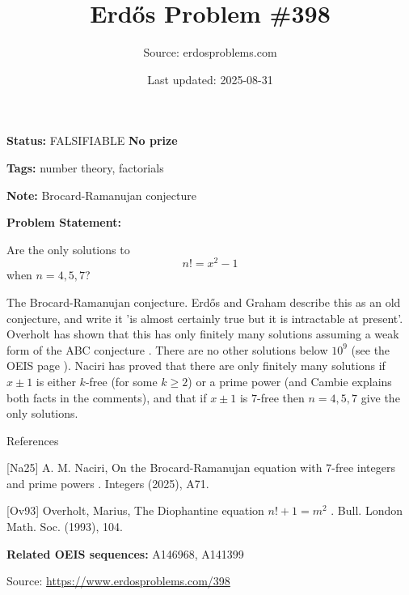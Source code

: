 \documentclass{article}
\title{Erd\H{o}s Problem \#398}
\date{Last updated: 2025-08-31}
\author{Source: erdosproblems.com}
\begin{document}
\maketitle

\noindent\textbf{Status:} FALSIFIABLE \quad \textbf{No prize}

\noindent\textbf{Tags:} number theory, factorials

\medskip
\noindent\textbf{Note:} Brocard-Ramanujan conjecture

\medskip

\noindent\textbf{Problem Statement:}

Are the only solutions to\[n!=x^2-1\]when $n=4,5,7$?




The Brocard-Ramanujan conjecture. Erd\H{o}s and Graham describe this as an old conjecture, and write it 'is almost certainly true but it is intractable at present'. Overholt \cite{Ov93} has shown that this has only finitely many solutions assuming a weak form of the ABC conjecture . There are no other solutions below $10^9$ (see the OEIS page ). Naciri \cite{Na25} has proved that there are only finitely many solutions if $x\pm 1$ is either $k$-free (for some $k\geq 2$) or a prime power (and Cambie explains both facts in the comments), and that if $x\pm 1$ is $7$-free then $n=4,5,7$ give the only solutions.




References

[Na25] A. M. Naciri, On the Brocard-Ramanujan equation with $7$-free integers and prime powers . Integers (2025), A71.

[Ov93] Overholt, Marius, The Diophantine equation $n!+1=m^2$ . Bull. London Math. Soc. (1993), 104.

\noindent\textbf{Related OEIS sequences:} A146968, A141399

\bigskip
\noindent\small{Source: \url{https://www.erdosproblems.com/398}}
\end{document}
